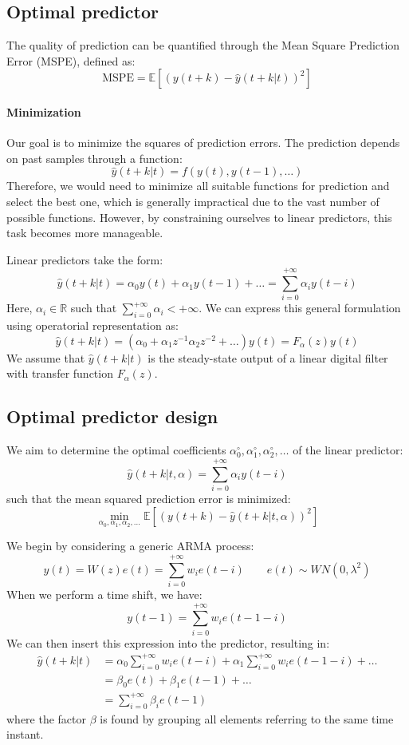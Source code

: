 \subsection{Optimal predictor}

The quality of prediction can be quantified through the Mean Square Prediction Error (MSPE), defined as:
\[\text{MSPE}=\mathbb{E}\left[ \left(y(t+k)-\hat{y}(t+k|t) \right)^2 \right]\]

\paragraph*{Minimization}
Our goal is to minimize the squares of prediction errors. 
The prediction depends on past samples through a function:
\[\hat{y}(t+k|t)=f(y(t),y(t-1),\dots)\]
Therefore, we would need to minimize all suitable functions for prediction and select the best one, which is generally impractical due to the vast number of possible functions. 
However, by constraining ourselves to linear predictors, this task becomes more manageable.

Linear predictors take the form:
\[\hat{y}(t+k|t)=\alpha_0y(t)+\alpha_1y(t-1)+\dots=\sum_{i=0}^{+\infty}\alpha_iy(t-i)\]
Here, $\alpha_i \in \mathbb{R}$ such that $\sum_{i=0}^{+\infty}\alpha_i<+\infty$. 
We can express this general formulation using operatorial representation as:
\[\hat{y}(t+k|t)=\left(\alpha_0+\alpha_1z^{-1}\alpha_2z^{-2}+\dots\right)y(t)=F_{\alpha}(z)y(t)\]
We assume that $\hat{y}(t+k|t)$ is the steady-state output of a linear digital filter with transfer function $F_{\alpha}(z)$.

\subsection{Optimal predictor design}
We aim to determine the optimal coefficients $\alpha_0^{\circ},\alpha_1^{\circ},\alpha_2^{\circ},\dots$ of the linear predictor:
\[\hat{y}(t+k|t,\alpha)=\sum_{i=0}^{+\infty}\alpha_iy(t-i)\]
such that the mean squared prediction error is minimized:
\[\min_{\alpha_0,\alpha_1,\alpha_2,\dots}\mathbb{E}\left[\left( y(t+k)-\hat{y}(t+k|t,\alpha) \right)^2\right] \]

We begin by considering a generic ARMA process:
\[y(t)=W(z)e(t) =\sum_{i=0}^{+\infty}w_ie(t-i) \qquad e(t)\sim WN(0,\lambda^2)\]
When we perform a time shift, we have:
\[y(t-1)=\sum_{i=0}^{+\infty}w_ie(t-1-i)\]
We can then insert this expression into the predictor, resulting in:
\begin{align*}
    \hat{y}(t+k|t)  &=\alpha_0\sum_{i=0}^{+\infty}w_ie(t-i)+\alpha_1\sum_{i=0}^{+\infty}w_ie(t-1-i)+\dots \\
                    &=\beta_0e(t)+\beta_1e(t-1)+\dots \\
                    &=\sum_{i=0}^{+\infty}\beta_ie(t-1)
\end{align*}
where the factor $\beta$ is found by grouping all elements referring to the same time instant.


